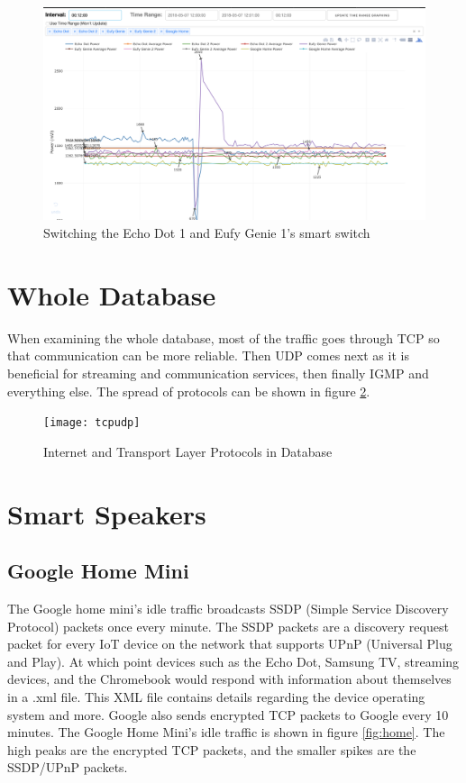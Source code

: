 \begin{figure}[H]
    \centering
    \includegraphics[width=1\textwidth]{figures/switchEchoEufyPlug.png}
    \caption{Switching the Echo Dot 1 and Eufy Genie 1's smart switch}
    \label{fig:switchEchoEufyPlug}
\end{figure}

\section{Whole Database}
\label{wholeDB}
When examining the whole database, most of the traffic goes through TCP so that communication can be more reliable. Then UDP comes next as it is beneficial for streaming and communication services, then finally IGMP and everything else. The spread of protocols can be shown in figure \ref{fig:tcpudp}.

\label{Whole Database}
\begin{figure}[H]
  \centering
    \texttt{[image: tcpudp]}
  \caption{Internet and Transport Layer Protocols in Database}
  \label{fig:tcpudp}
\end{figure}

\section{Smart Speakers}
\label{smartSpeakerResults}
\subsection{Google Home Mini}
The Google home mini's idle traffic broadcasts SSDP (Simple Service Discovery Protocol) packets once every minute. The SSDP packets are a discovery request packet for every IoT device on the network that supports UPnP (Universal Plug and Play). At which point devices such as the Echo Dot, Samsung TV, streaming devices, and the Chromebook would respond with information about themselves in a .xml file. This XML file contains details regarding the device operating system and more. Google also sends encrypted TCP packets to Google every 10 minutes. The Google Home Mini's idle traffic is shown in figure \ref{fig:home}. The high peaks are the encrypted TCP packets, and the smaller spikes are the SSDP/UPnP packets.

